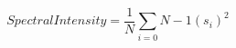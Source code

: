 \begin{equation}
\mathit{SpectralIntensity} = \frac{1}{N} \sum_{i=0}{N-1} (s_i)^2
\label{eq:spectral_intensity}
\end{equation}
